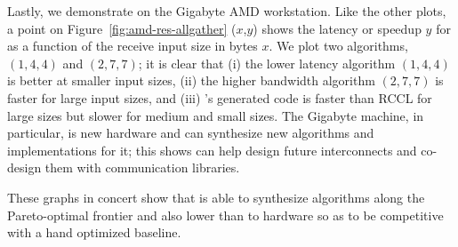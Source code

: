 Lastly, we demonstrate \allgather on the Gigabyte AMD workstation.
Like the other plots, a point on Figure~\ref{fig:amd-res-allgather}
($x$,$y$) shows the latency or speedup $y$ for \allgather as a function
of the receive input size in bytes $x$.  We plot two algorithms,
$(1,4,4)$ and $(2,7,7)$; it is clear that (i) the lower latency
algorithm $(1,4,4)$ is better at smaller input sizes, (ii) the higher
bandwidth algorithm $(2,7,7)$ is faster for large input sizes, and
(iii) \tool's generated code is faster than RCCL for large sizes but
slower for medium and small sizes. The Gigabyte machine, in
particular, is new hardware and \tool{} can synthesize new algorithms
and implementations for it; this shows \tool{} can help design future
interconnects and co-design them with communication libraries.

These graphs in concert show that \tool{} is able to synthesize
algorithms along the Pareto-optimal frontier and also lower than to
hardware so as to be competitive with a hand optimized baseline.




